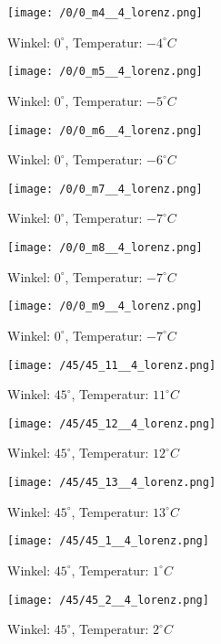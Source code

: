 \clearpage
\begin{figure}[c]
\centering
\texttt{[image: /0/0\_m4\_\_4\_lorenz.png]}
\caption{Winkel: $ 0^\circ$, Temperatur: $ -4^\circ C$}
\end{figure}
\begin{figure}[c]
\centering
\texttt{[image: /0/0\_m5\_\_4\_lorenz.png]}
\caption{Winkel: $ 0^\circ$, Temperatur: $ -5^\circ C$}
\end{figure}
\clearpage
\begin{figure}[c]
\centering
\texttt{[image: /0/0\_m6\_\_4\_lorenz.png]}
\caption{Winkel: $ 0^\circ$, Temperatur: $ -6^\circ C$}
\end{figure}
\begin{figure}[c]
\centering
\texttt{[image: /0/0\_m7\_\_4\_lorenz.png]}
\caption{Winkel: $ 0^\circ$, Temperatur: $ -7^\circ C$}
\end{figure}
\clearpage
\begin{figure}[c]
\centering
\texttt{[image: /0/0\_m8\_\_4\_lorenz.png]}
\caption{Winkel: $ 0^\circ$, Temperatur: $ -7^\circ C$}
\end{figure}
\begin{figure}[c]
\centering
\texttt{[image: /0/0\_m9\_\_4\_lorenz.png]}
\caption{Winkel: $ 0^\circ$, Temperatur: $ -7^\circ C$}
\end{figure}
\clearpage
\begin{figure}[c]
\centering
\texttt{[image: /45/45\_11\_\_4\_lorenz.png]}
\caption{Winkel: $ 45^\circ$, Temperatur: $ 11^\circ C$}
\end{figure}
\begin{figure}[c]
\centering
\texttt{[image: /45/45\_12\_\_4\_lorenz.png]}
\caption{Winkel: $ 45^\circ$, Temperatur: $ 12^\circ C$}
\end{figure}
\clearpage
\begin{figure}[c]
\centering
\texttt{[image: /45/45\_13\_\_4\_lorenz.png]}
\caption{Winkel: $ 45^\circ$, Temperatur: $ 13^\circ C$}
\end{figure}
\begin{figure}[c]
\centering
\texttt{[image: /45/45\_1\_\_4\_lorenz.png]}
\caption{Winkel: $ 45^\circ$, Temperatur: $ 1^\circ C$}
\end{figure}
\clearpage
\begin{figure}[c]
\centering
\texttt{[image: /45/45\_2\_\_4\_lorenz.png]}
\caption{Winkel: $ 45^\circ$, Temperatur: $ 2^\circ C$}
\end{figure}
